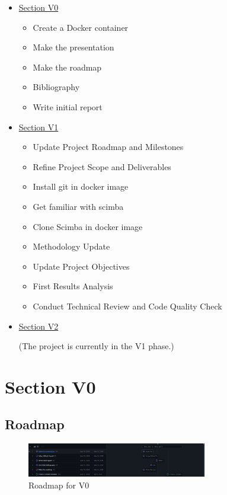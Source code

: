 \documentclass[12pt]{article}
\begin{document}
\begin{itemize}
\item{\hyperref[sec:Section V0]{Section V0}}
\begin{itemize}
    \item Create a Docker container
    \item Make the presentation
    \item Make the roadmap
    \item Bibliography
    \item Write initial report
\end{itemize}

\item{\hyperref[sec:Section V1]{Section V1}}
\begin{itemize}
    \item Update Project Roadmap and Milestones
    \item Refine Project Scope and Deliverables
    \item Install git in docker image
    \item Get familiar with scimba	
    \item Clone Scimba in docker image	
    \item Methodology Update 
    \item Update Project Objectives
    \item First Results Analysis
    \item Conduct Technical Review and Code Quality Check 
\end{itemize}

\item{\hyperref[sec:Section V2]{Section V2}}

(The project is currently in the V1 phase.)
\end{itemize}

\newpage

\section{Section V0}  
\label{sec:Section V0}

\newpage

\subsection{Roadmap}
\begin{figure}[H]
    \centering
    \includegraphics[width=0.7\textwidth]{images/roadmapV0.png}
    \caption{Roadmap for V0}
\end{figure}
\end{document}
